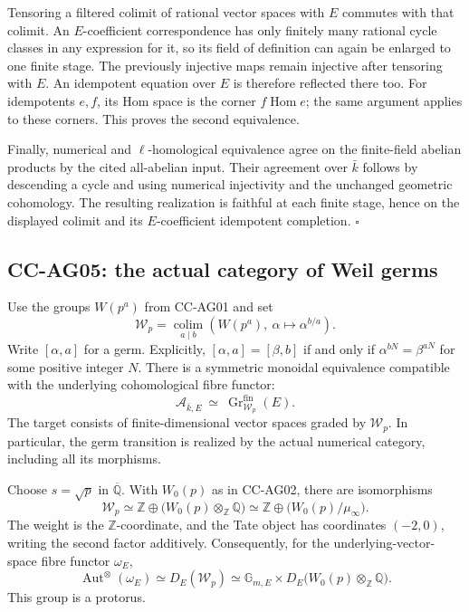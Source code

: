 \documentclass[11pt,a4paper]{article}
\theoremstyle{definition}\newtheorem{definition}[theorem]{Definition}
\theoremstyle{remark}\newtheorem{remark}[theorem]{Remark}
\begin{document}
Tensoring a filtered colimit of rational vector spaces with \(E\)
commutes with that colimit. An \(E\)-coefficient correspondence has
only finitely many rational cycle classes in any expression for it,
so its field of definition can again be enlarged to one finite
stage. The previously injective maps remain injective after
tensoring with \(E\). An idempotent equation over \(E\) is therefore
reflected there too. For idempotents \(e,f\), its Hom space is the
corner \(f\operatorname{Hom}e\); the same argument applies to these
corners. This proves the second equivalence.

Finally, numerical and \(\ell\)-homological equivalence agree on
the finite-field abelian products by the cited all-abelian input.
Their agreement over \(\bar k\) follows by descending a cycle and
using numerical injectivity and the unchanged geometric
cohomology. The resulting realization is faithful at each finite
stage, hence on the displayed colimit and its \(E\)-coefficient
idempotent completion. \(\square\)

\subsection{CC-AG05: the actual category of Weil germs}

Use the groups \(W(p^a)\) from CC-AG01 and set
\[
 \mathcal W_p=\underset{a\mid b}{\operatorname{colim}}
 \left(W(p^a),\ \alpha\longmapsto\alpha^{b/a}\right).
                                                        \tag{CC-AG.8}
\]
Write \([\alpha,a]\) for a germ. Explicitly,
\([\alpha,a]=[\beta,b]\) if and only if
\(\alpha^{bN}=\beta^{aN}\) for some positive integer \(N\).
There is a symmetric monoidal equivalence compatible with the
underlying cohomological fibre functor:
\[
 \mathcal A_{\bar k,E}\ \simeq\
 \operatorname{Gr}^{\mathrm{fin}}_{\mathcal W_p}(E).
                                                        \tag{CC-AG.9}
\]
The target consists of finite-dimensional vector spaces graded by
\(\mathcal W_p\). In particular, the germ transition is realized by
the actual numerical category, including all its morphisms.

Choose \(s=\sqrt p\) in \(\overline{\mathbb Q}\). With
\(W_0(p)\) as in CC-AG02, there are isomorphisms
\[
 \mathcal W_p
 \simeq \mathbb Z\oplus\bigl(W_0(p)\otimes_{\mathbb Z}\mathbb Q\bigr)
 \simeq \mathbb Z\oplus\bigl(W_0(p)/\mu_\infty\bigr).
                                                        \tag{CC-AG.10}
\]
The weight is the \(\mathbb Z\)-coordinate, and the Tate object
has coordinates \((-2,0)\), writing the second factor additively.
Consequently, for the underlying-vector-space fibre functor
\(\omega_E\),
\[
 \operatorname{Aut}^{\otimes}(\omega_E)
 \simeq D_E(\mathcal W_p)
 \simeq \mathbb G_{m,E}\times
 D_E\bigl(W_0(p)\otimes_{\mathbb Z}\mathbb Q\bigr). \tag{CC-AG.11}
\]
This group is a protorus.
\end{document}
